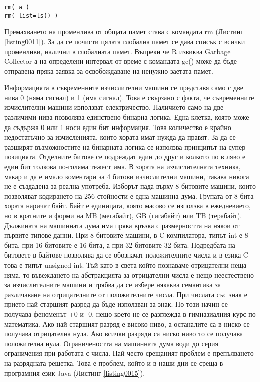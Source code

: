 \begin{lstlisting}[caption=Премахване на променливи от глобалната памет, label=listing0011]
rm( a )
rm( list=ls() )
\end{lstlisting}

Премахването на променлива от общата памет става с командата rm (Листинг \ref{listing0011}). За да се почисти цялата глобална памет се дава списък с всички променливи, налични в глобалната памет. Въпреки че R извиква Garbage Collector-а на определени интервал от време с командата gc() може да бъде отправена пряка заявка за освобождаване на ненужно заетата памет. 

Информацията в съвременните изчислителни машини се представя само с две нива 0 (няма сигнал) и 1 (има сигнал). Това е свързано с факта, че съвременните изчислителни машини използват електричество. Наличието само на две различими нива позволява единствено бинарна логика. Една клетка, която може да съдържа 0 или 1 носи един бит информация. Това количество е крайно недостатъчно за изчисленията, които хората имат нужда да правят. За да се разширят възможностите на бинарната логика се използва принципът на супер позицията. Отделните битове се подреждат един до друг и колкото по в ляво е един бит толкова по-голяма тежест има. В зората на изчислителната техника, макар и да е имало коментари за 4 битови изчислителни машини, такава никога не е създадена за реална употреба. Изборът пада върху 8 битовите машини, които позволяват кодирането на 256 стойности е една машинна дума. Групата от 8 бита хората наричат байт. Байт е единицата, която масово се използва в ежедневието, но в кратните и форми на MB (мегабайт), GB (гигабайт) или TB (терабайт). Дължината на машинната дума има пряка връзка с размерността на някои от първите типове данни. При 8 битовите машини, в C компилатора, типът int е 8 бита, при 16 битовите е 16 бита, а при 32 битовите 32 бита. Подредбата на битовете в байтове позволява да се обозначат положителните числа и в езика C това е типът unsigned int. Тъй като в света който познаваме отрицателни неща няма, то въвеждането на абстракцията за отрицателни числа е нещо неестествено за изчислителните машини и трябва да се избере някаква семантика за различаване на отрицателните от положителните числа. При числата със знак е прието най-старшият разред да бъде използван за знак. По този начин се получава феноменът +0 и -0, нещо което не се разглежда в гимназиалния курс по математика. Ако най-старшият разряд е високо ниво, а останалите са в ниско се получава отрицателна нула. Ако всички разряди са ниско ниво то се получава положителна нула. Ограничеността на машинната дума води до серия ограничения при работата с числа. Най-често срещаният проблем е препълването на разрядната решетка. Това е проблем, който и в наши дни се среща в програмния език Java (Листинг \ref{listing0015}).

